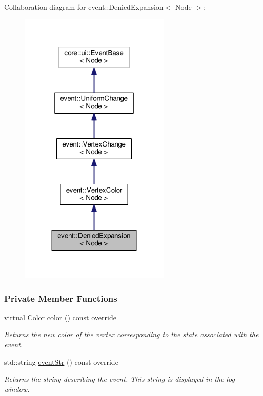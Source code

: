 Collaboration diagram for event\+:\+:Denied\+Expansion$<$ Node $>$\+:\nopagebreak
\begin{figure}[H]
\begin{center}
\leavevmode
\includegraphics[width=203pt]{structevent_1_1DeniedExpansion__coll__graph}
\end{center}
\end{figure}
\subsubsection*{Private Member Functions}
\begin{DoxyCompactItemize}
\item 
virtual \hyperlink{colors_8h_ab87bacfdad76e61b9412d7124be44c1c}{Color} \hyperlink{structevent_1_1DeniedExpansion_a369a406bce1f609963986f2847e50d3c}{color} () const override
\begin{DoxyCompactList}\small\item\em Returns the new color of the vertex corresponding to the state associated with the event. \end{DoxyCompactList}\item 
std\+::string \hyperlink{structevent_1_1DeniedExpansion_af8e8a3f84f28291569e48e7218091938}{event\+Str} () const override
\begin{DoxyCompactList}\small\item\em Returns the string describing the event. This string is displayed in the log window. \end{DoxyCompactList}\end{DoxyCompactItemize}
